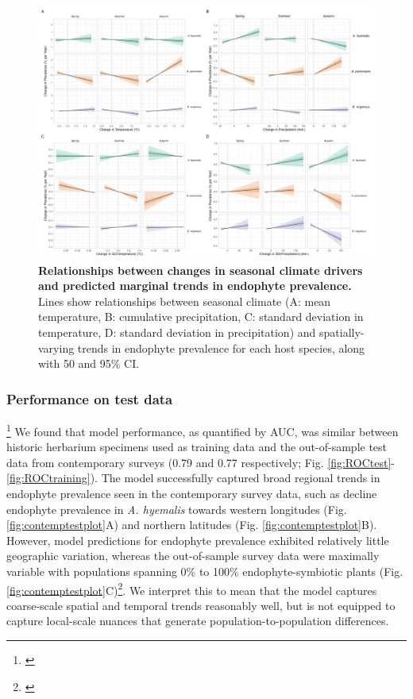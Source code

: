 \documentclass[11pt]{article}
\newcommand{\tom}[2]{{\color{red}{#1}}\footnote{\textit{\color{red}{#2}}}}
\begin{document}
\begin{figure}[H]
	\centering
	\includegraphics[width = \linewidth]{../Plots/climate_trends_plot.png}
	\caption{\textbf{Relationships between changes in seasonal climate drivers and predicted marginal trends in endophyte prevalence.} Lines show relationships between seasonal climate (A: mean temperature, B: cumulative precipitation, C: standard deviation in temperature, D: standard deviation in precipitation) and spatially-varying trends in endophyte prevalence for each host species, along with 50 and 95\% CI.}
	\label{fig:climate_correlation_plot}
\end{figure}

\subsubsection*{Performance on test data}
\tom{}{The order of the results does not match the order of the methods.}
We found that model performance, as quantified by AUC, was similar between historic herbarium specimens used as training data and the out-of-sample test data from contemporary surveys (0.79 and 0.77 respectively; Fig. \ref{fig:ROCtest}-\ref{fig:ROCtraining}).  
The model successfully captured broad regional trends in endophyte prevalence seen in the contemporary survey data, such as decline endophyte prevalence in \emph{A. hyemalis} towards western longitudes (Fig. \ref{fig:contemptestplot}A) and northern latitudes (Fig. \ref{fig:contemptestplot}B). 
However, model predictions for endophyte prevalence exhibited relatively little geographic variation, whereas the out-of-sample survey data were maximally variable with populations spanning 0\% to 100\% endophyte-symbiotic plants (Fig. \ref{fig:contemptestplot}C)\tom{}{Love the figure but I think the legend can be improved. It does not describe the content very well.}. 
We interpret this to mean that the model captures coarse-scale spatial and temporal trends reasonably well, but is not equipped to capture local-scale nuances that generate population-to-population differences. 
\end{document}
